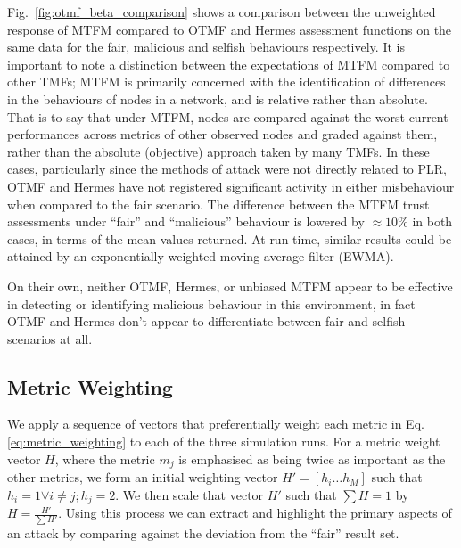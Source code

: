Fig.~\ref{fig:otmf_beta_comparison} shows a comparison between the unweighted response of MTFM compared to OTMF and Hermes assessment functions on the same data for the fair, malicious and selfish behaviours respectively.
It is important to note a distinction between the expectations of MTFM compared to other TMFs; MTFM is primarily concerned with the identification of differences in the behaviours of nodes in a network, and is relative rather than absolute.
That is to say that under MTFM, nodes are compared against the worst current performances across metrics of other observed nodes and graded against them, rather than the absolute (objective) approach taken by many TMFs.
In these cases, particularly since the methods of attack were not directly related to PLR, OTMF and Hermes have not registered significant activity in either misbehaviour when compared to the fair scenario.
The difference between the MTFM trust assessments under ``fair'' and ``malicious'' behaviour is lowered by $\approx 10\%$ in both cases, in terms of the mean values returned.
At run time, similar results could be attained by an exponentially weighted moving average filter (EWMA).

On their own, neither OTMF, Hermes, or unbiased MTFM appear to be effective in detecting or identifying malicious behaviour in this environment, in fact OTMF and Hermes don't appear to differentiate between fair and selfish scenarios at all.


\subsection{Metric Weighting}
%

We apply a sequence of vectors that preferentially weight each metric in Eq. \eqref{eq:metric_weighting} to each of the three simulation runs.
For a metric weight vector $H$, where the metric $m_j$ is emphasised as being twice as important as the other metrics, we form an initial weighting vector $H'=[h_i\dots h_M]$ such that $h_i = 1 \forall i \ne j; h_j=2$.
We then scale that vector $H'$ such that $\sum H = 1$ by $H= \frac{H'}{\sum H'}$.
Using this process we can extract and highlight the primary aspects of an attack by comparing against the deviation from the ``fair'' result set. 

